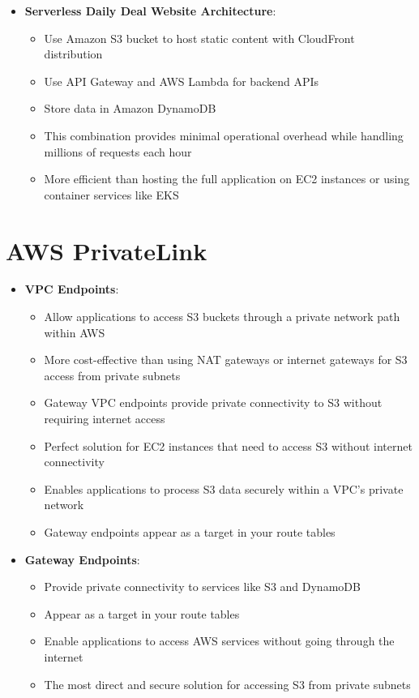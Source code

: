 \documentclass[11pt,a4paper]{report}
\begin{document}
\begin{itemize}
\begin{itemize}
  \item CloudFront caches content at global edge locations, absorbing attack traffic before reaching origin servers
  \item Ensures websites remain available even during DDoS attacks
  \item CloudFront standard protection is included at no extra cost
\end{itemize}
  \item \textbf{Serverless Daily Deal Website Architecture}:
\begin{itemize}
  \item Use Amazon S3 bucket to host static content with CloudFront distribution
  \item Use API Gateway and AWS Lambda for backend APIs
  \item Store data in Amazon DynamoDB
  \item This combination provides minimal operational overhead while handling millions of requests each hour
  \item More efficient than hosting the full application on EC2 instances or using container services like EKS
\end{itemize}
\end{itemize}


\section{AWS PrivateLink}

\begin{itemize}
  \item \textbf{VPC Endpoints}:
\begin{itemize}
  \item Allow applications to access S3 buckets through a private network path within AWS
  \item More cost-effective than using NAT gateways or internet gateways for S3 access from private subnets
  \item Gateway VPC endpoints provide private connectivity to S3 without requiring internet access
  \item Perfect solution for EC2 instances that need to access S3 without internet connectivity
  \item Enables applications to process S3 data securely within a VPC's private network
  \item Gateway endpoints appear as a target in your route tables
\end{itemize}
  \item \textbf{Gateway Endpoints}:
\begin{itemize}
  \item Provide private connectivity to services like S3 and DynamoDB
  \item Appear as a target in your route tables
  \item Enable applications to access AWS services without going through the internet
  \item The most direct and secure solution for accessing S3 from private subnets
\end{itemize}
\end{itemize}
\end{document}
